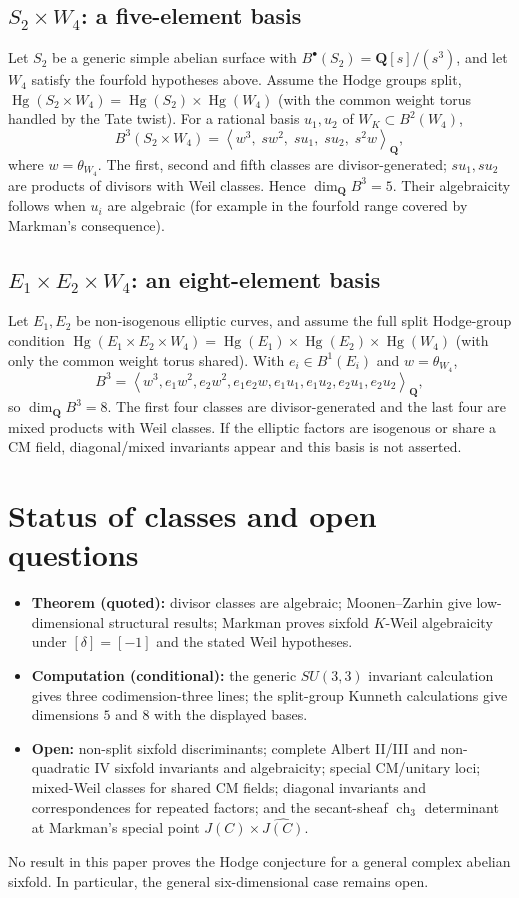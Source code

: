 \documentclass[11pt]{article}
\newcommand{\Q}{\mathbf Q}
\newcommand{\B}{B}
\newcommand{\Hg}{\operatorname{Hg}}
\begin{document}
\subsection{$S_2\times W_4$: a five-element basis}
Let $S_2$ be a generic simple abelian surface with $\B^\bullet(S_2)=\Q[s]/(s^3)$, and let $W_4$ satisfy the fourfold hypotheses above.  Assume the Hodge groups split, $\Hg(S_2\times W_4)=\Hg(S_2)\times\Hg(W_4)$ (with the common weight torus handled by the Tate twist).  For a rational basis $u_1,u_2$ of $W_K\subset\B^2(W_4)$,
\[
 \B^3(S_2\times W_4)=\left\langle w^3,\;sw^2,\;su_1,\;su_2,\;s^2w\right\rangle_{\Q},
\]
where $w=\theta_{W_4}$.  The first, second and fifth classes are divisor-generated; $su_1,su_2$ are products of divisors with Weil classes.  Hence $\dim_{\Q}\B^3=5$.  Their algebraicity follows when $u_i$ are algebraic (for example in the fourfold range covered by Markman's consequence).

\subsection{$E_1\times E_2\times W_4$: an eight-element basis}
Let $E_1,E_2$ be non-isogenous elliptic curves, and assume the full split Hodge-group condition
$\Hg(E_1\times E_2\times W_4)=\Hg(E_1)\times\Hg(E_2)\times\Hg(W_4)$ (with only the common weight torus shared).  With $e_i\in\B^1(E_i)$ and $w=\theta_{W_4}$,
\[
\B^3=\left\langle w^3,e_1w^2,e_2w^2,e_1e_2w,
 e_1u_1,e_1u_2,e_2u_1,e_2u_2\right\rangle_{\Q},
\]
so $\dim_{\Q}\B^3=8$.  The first four classes are divisor-generated and the last four are mixed products with Weil classes.  If the elliptic factors are isogenous or share a CM field, diagonal/mixed invariants appear and this basis is not asserted.

\section{Status of classes and open questions}
\begin{itemize}
\item \textbf{Theorem (quoted):} divisor classes are algebraic; Moonen--Zarhin give low-dimensional structural results; Markman proves sixfold $K$-Weil algebraicity under $[\delta]=[-1]$ and the stated Weil hypotheses.
\item \textbf{Computation (conditional):} the generic $SU(3,3)$ invariant calculation gives three codimension-three lines; the split-group Kunneth calculations give dimensions $5$ and $8$ with the displayed bases.
\item \textbf{Open:} non-split sixfold discriminants; complete Albert II/III and non-quadratic IV sixfold invariants and algebraicity; special CM/unitary loci; mixed-Weil classes for shared CM fields; diagonal invariants and correspondences for repeated factors; and the secant-sheaf $\operatorname{ch}_3$ determinant at Markman's special point $J(C)\times\widehat{J(C)}$.
\end{itemize}
No result in this paper proves the Hodge conjecture for a general complex abelian sixfold.  In particular, the general six-dimensional case remains open.
\end{document}
